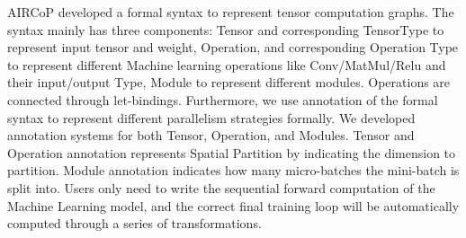 \documentclass[sigplan, nonacm]{acmart}\settopmatter{printfolios=true,printccs=false,printacmref=false}
\begin{document}
 AIRCoP developed a formal syntax to represent tensor computation graphs. The syntax mainly has three components: Tensor and corresponding TensorType to represent input tensor and weight, Operation, and corresponding Operation Type to represent different Machine learning operations like Conv/MatMul/Relu and their input/output Type, Module to represent different modules. Operations are connected through let-bindings. Furthermore, we use annotation of the formal syntax to represent different parallelism strategies formally. We developed annotation systems for both Tensor, Operation, and Modules. Tensor and Operation annotation represents Spatial Partition by indicating the dimension to partition. Module annotation indicates how many micro-batches the mini-batch is split into. Users only need to write the sequential forward computation of the Machine Learning model, and the correct final training loop will be automatically computed through a series of transformations.
\end{document}
